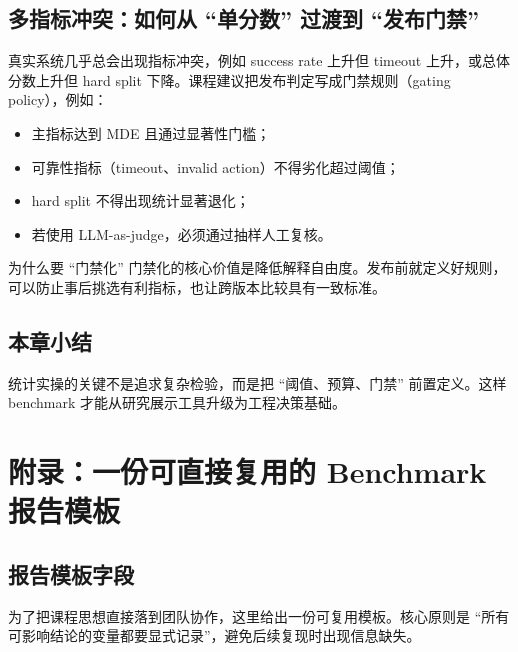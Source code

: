 \documentclass[a4paper]{article}
\begin{document}
\subsection{多指标冲突：如何从 ``单分数'' 过渡到 ``发布门禁''}
真实系统几乎总会出现指标冲突，例如 success rate 上升但 timeout 上升，或总体分数上升但 hard split 下降。课程建议把发布判定写成门禁规则（gating policy），例如：
\begin{itemize}
    \item 主指标达到 MDE 且通过显著性门槛；
    \item 可靠性指标（timeout、invalid action）不得劣化超过阈值；
    \item hard split 不得出现统计显著退化；
    \item 若使用 LLM-as-judge，必须通过抽样人工复核。
\end{itemize}

\begin{knowledgebox}{为什么要 ``门禁化''}
门禁化的核心价值是降低解释自由度。发布前就定义好规则，可以防止事后挑选有利指标，也让跨版本比较具有一致标准。
\end{knowledgebox}

\subsection{本章小结}
统计实操的关键不是追求复杂检验，而是把 ``阈值、预算、门禁'' 前置定义。这样 benchmark 才能从研究展示工具升级为工程决策基础。

\section{附录：一份可直接复用的 Benchmark 报告模板}

\subsection{报告模板字段}
为了把课程思想直接落到团队协作，这里给出一份可复用模板。核心原则是 ``所有可影响结论的变量都要显式记录''，避免后续复现时出现信息缺失。
\end{document}
